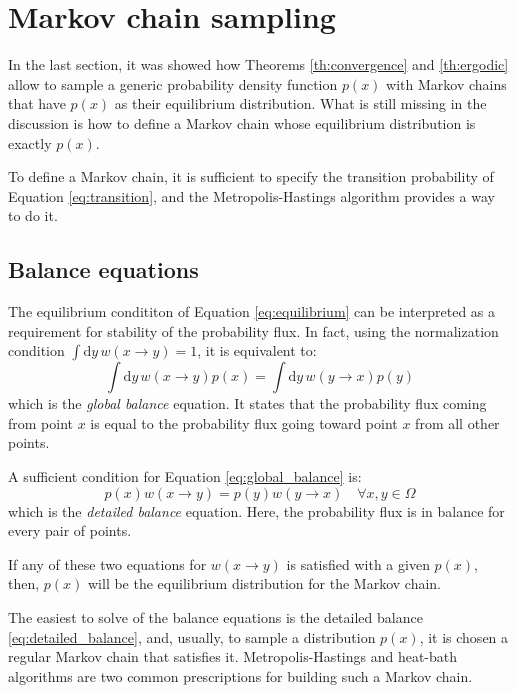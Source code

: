 \section{Markov chain sampling}
In the last section, it was showed how Theorems \ref{th:convergence} and \ref{th:ergodic} allow to sample a generic probability density function $p(x)$
with Markov chains that have $p(x)$ as their equilibrium distribution.
What is still missing in the discussion is how to define a Markov chain whose equilibrium distribution is exactly $p(x)$.

To define a Markov chain, it is sufficient to specify the transition probability of Equation \eqref{eq:transition},
and the Metropolis-Hastings algorithm provides a way to do it.

\subsection*{Balance equations}
The equilibrium condititon of Equation \eqref{eq:equilibrium}
can be interpreted as a requirement for stability of the probability flux.
In fact, using the normalization condition $\int\mathrm dy\,w(x \to y) = 1$,
it is equivalent to:
\begin{equation}\label{eq:global_balance}
	\int\mathrm dy\,w(x \to y)p(x) = \int\mathrm dy\,w(y \to x)p(y)
\end{equation}
which is the \emph{global balance} equation.
It states that the probability flux coming from point $x$
is equal to the probability flux going toward point $x$ from all other points.

A sufficient condition for Equation \eqref{eq:global_balance} is:
\begin{equation}\label{eq:detailed_balance}
	p(x)w(x \to y) = p(y)w(y \to x) \quad \forall x,y\in\Omega
\end{equation}
which is the \emph{detailed balance} equation.
Here, the probability flux is in balance for every pair of points.

If any of these two equations for $w(x \to y)$ is satisfied with a given $p(x)$,
then, $p(x)$ will be the equilibrium distribution for the Markov chain.

The easiest to solve of the balance equations is the detailed balance \eqref{eq:detailed_balance},
and, usually, to sample a distribution $p(x)$, it is chosen a regular Markov chain that satisfies it.
Metropolis-Hastings and heat-bath algorithms are two common prescriptions for building such a Markov chain.

